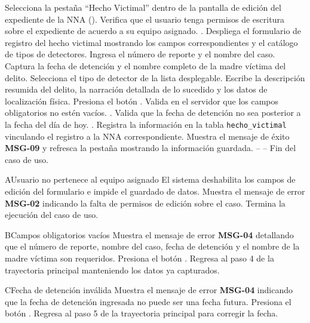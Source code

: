 \begin{UCtrayectoria}
	\UCpaso[\UCactor] Selecciona la pestaña ``Hecho Victimal'' dentro de la pantalla de edición del expediente de la NNA ().
	\UCpaso Verifica que el usuario tenga permisos de escritura sobre el expediente de acuerdo a su equipo asignado. .
	\UCpaso Despliega el formulario de registro del hecho victimal mostrando los campos correspondientes y el catálogo de tipos de detectores.
	\UCpaso[\UCactor] Ingresa el número de reporte y el nombre del caso.
	\UCpaso[\UCactor] Captura la fecha de detención y el nombre completo de la madre víctima del delito.
	\UCpaso[\UCactor] Selecciona el tipo de detector de la lista desplegable.
	\UCpaso[\UCactor] Escribe la descripción resumida del delito, la narración detallada de lo sucedido y los datos de localización física.
	\UCpaso[\UCactor] Presiona el botón .
	\UCpaso Valida en el servidor que los campos obligatorios no estén vacíos. .
	\UCpaso Valida que la fecha de detención no sea posterior a la fecha del día de hoy. .
	\UCpaso Registra la información en la tabla \texttt{hecho\_victimal} vinculando el registro a la NNA correspondiente.
	\UCpaso Muestra el mensaje de éxito {\bf MSG-09} y refresca la pestaña mostrando la información guardada.
	\UCpaso[] -- -- Fin del caso de uso.
\end{UCtrayectoria}

\begin{UCtrayectoriaA}{A}{Usuario no pertenece al equipo asignado}
	\UCpaso El sistema deshabilita los campos de edición del formulario e impide el guardado de datos.
	\UCpaso Muestra el mensaje de error {\bf MSG-02} indicando la falta de permisos de edición sobre el caso.
	\UCpaso Termina la ejecución del caso de uso.
\end{UCtrayectoriaA}

\begin{UCtrayectoriaA}{B}{Campos obligatorios vacíos}
	\UCpaso Muestra el mensaje de error {\bf MSG-04} detallando que el número de reporte, nombre del caso, fecha de detención y el nombre de la madre víctima son requeridos.
	\UCpaso[\UCactor] Presiona el botón .
	\UCpaso Regresa al paso 4 de la trayectoria principal manteniendo los datos ya capturados.
\end{UCtrayectoriaA}

\begin{UCtrayectoriaA}{C}{Fecha de detención inválida}
	\UCpaso Muestra el mensaje de error {\bf MSG-04} indicando que la fecha de detención ingresada no puede ser una fecha futura.
	\UCpaso[\UCactor] Presiona el botón .
	\UCpaso Regresa al paso 5 de la trayectoria principal para corregir la fecha.
\end{UCtrayectoriaA}
